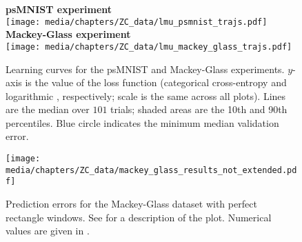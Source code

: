\begin{figure}
	\sffamily\small
	\centering
	\textbf{psMNIST experiment}\\[0.125cm]
	\texttt{[image: media/chapters/ZC\_data/lmu\_psmnist\_trajs.pdf]}\\[0.25cm]
	\textbf{Mackey-Glass experiment}\\[0.125cm]
	\texttt{[image: media/chapters/ZC\_data/lmu\_mackey\_glass\_trajs.pdf]}
	\caption[Learning curves for the psMNIST and Mackey-Glass experiments]{Learning curves for the psMNIST and Mackey-Glass experiments. $y$-axis is the value of the loss function (categorical cross-entropy and logarithmic \MSE, respectively; scale is the same across all plots). Lines are the median over $101$ trials; shaded areas are the 10th and 90th percentiles. Blue circle indicates the minimum median validation error.}
	\label{fig:lmu_trajs}
\end{figure}


\begin{figure}[p]
\centering
\texttt{[image: media/chapters/ZC\_data/mackey\_glass\_results\_not\_extended.pdf]}
\caption[Prediction errors for the Mackey-Glass dataset with perfect rectangle windows]{Prediction errors for the Mackey-Glass dataset with perfect rectangle windows. See  for a description of the plot.
Numerical values are given in .}
\label{fig:mackey_glass_ne}
\end{figure}

